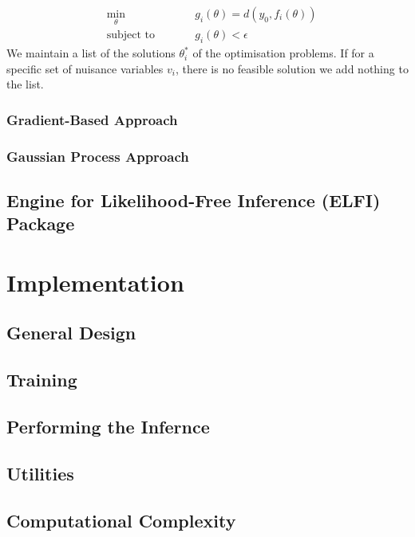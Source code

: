 \documentclass[11pt,twoside]{article}
\numberwithin{Theorem}{section}
\numberwithin{Definition}{section}
\numberwithin{Lemma}{section}
\numberwithin{Algorithm}{section}
\numberwithin{equation}{section}
\begin{document}
\begin{subequations}
\begin{alignat}{2}
&\!\min_{\theta}        &\qquad& g_i(\theta) = d(y_0,  f_i(\theta))\label{eq:optProb}\\
&\text{subject to} &      & g_i(\theta) < \epsilon
\end{alignat}
\end{subequations}
%
We maintain a list of the solutions $\theta_i^*$ of the optimisation problems. If for a specific set of nuisance variables $v_i$, there is no feasible solution we add nothing to the list.

\subsubsection{Gradient-Based Approach}

\subsubsection{Gaussian Process Approach}

\subsection{Engine for Likelihood-Free Inference (ELFI) Package}
\clearpage


\section{Implementation}

\subsection{General Design}

\subsection{Training}

\subsection{Performing the Infernce}

\subsection{Utilities}

\subsection{Computational Complexity}
\end{document}
